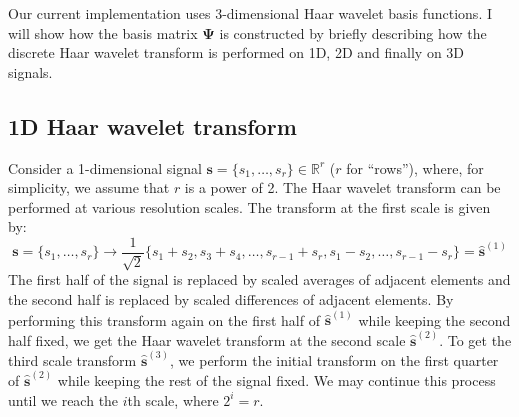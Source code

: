 \documentclass[final,3p]{report}
\let\bs\boldsymbol
\begin{document}
Our current implementation uses 3-dimensional Haar wavelet basis functions.
I will show how the basis matrix $\bs\Psi$ is constructed by briefly describing how the discrete Haar wavelet transform is performed on 1D, 2D and finally on 3D signals.

\subsection{1D Haar wavelet transform}
Consider a 1-dimensional signal $\bs s = \{s_1,\dots,s_r\} \in \mathbb{R}^r$ ($r$ for ``rows''), where, for simplicity, we assume that $r$ is a power of 2.
The Haar wavelet transform can be performed at various resolution scales.
The transform at the first scale is given by:
\begin{equation*}
\bs s = \{s_1,\dots,s_r\}\to \frac{1}{\sqrt{2}}\{s_1+s_2,s_3+s_4,\dots,s_{r-1}+s_r,s_1-s_2,\dots,s_{r-1}-s_r\}=\hat{\bs s}^{(1)}
\end{equation*}
The first half of the signal is replaced by scaled averages of adjacent elements and the second half is replaced by scaled differences of adjacent elements.
By performing this transform again on the first half of $\hat{\bs s}^{(1)}$ while keeping the second half fixed, we get the Haar wavelet transform at the second scale $\hat{\bs s}^{(2)}$. 
To get the third scale transform $\hat{\bs s}^{(3)}$, we perform the initial transform on the first quarter of $\hat{\bs s}^{(2)}$ while keeping the rest of the signal fixed.
We may continue this process until we reach the $i$th scale, where $2^i = r$.
\end{document}

